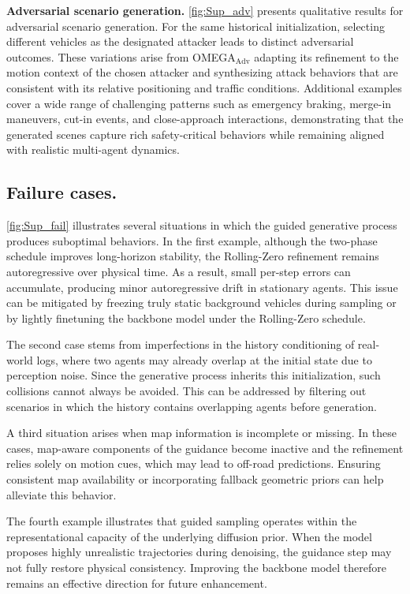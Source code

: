 \documentclass[10pt,twocolumn,letterpaper]{article}
\theoremstyle{plain}
\theoremstyle{remark}
\renewcommand{\paragraph}[1]{\vspace{.5em}\noindent\textbf{#1.}}
\begin{document}
\paragraph{Adversarial scenario generation}
\cref{fig:Sup_adv} presents qualitative results for adversarial
scenario generation. For the same historical initialization, selecting
different vehicles as the designated attacker leads to distinct
adversarial outcomes. These variations arise from
OMEGA$_\mathrm{Adv}$ adapting its refinement to the motion context of
the chosen attacker and synthesizing attack behaviors that are
consistent with its relative positioning and traffic
conditions. Additional examples cover a wide range of challenging
patterns such as emergency braking, merge-in maneuvers, cut-in events,
and close-approach interactions, demonstrating that the generated
scenes capture rich safety-critical behaviors while remaining aligned
with realistic multi-agent dynamics.


\subsection{Failure cases.}

\cref{fig:Sup_fail} illustrates several situations in which the guided
generative process produces suboptimal behaviors. In the first example,
although the two-phase schedule improves long-horizon stability, the Rolling-Zero refinement remains
autoregressive over physical time. As a result, small per-step
errors can accumulate, producing minor autoregressive drift in
stationary agents. This issue can be mitigated by freezing
truly static background vehicles during sampling or by lightly
finetuning the backbone model under the Rolling-Zero schedule.

The second case stems from imperfections in the history conditioning of
real-world logs, where two agents may already overlap at the initial
state due to perception noise. Since the generative process inherits
this initialization, such collisions cannot always be avoided. This can
be addressed by filtering out scenarios in which the history contains
overlapping agents before generation.

A third situation arises when map information is incomplete or missing.
In these cases, map-aware components of the guidance become inactive and
the refinement relies solely on motion cues, which may lead to
off-road predictions. Ensuring consistent map availability or
incorporating fallback geometric priors can help alleviate this
behavior.

The fourth example illustrates that guided sampling operates within
the representational capacity of the underlying diffusion prior.
When the model proposes highly unrealistic trajectories during
denoising, the guidance step may not fully restore physical
consistency. Improving the backbone model therefore remains an
effective direction for future enhancement.
\end{document}
